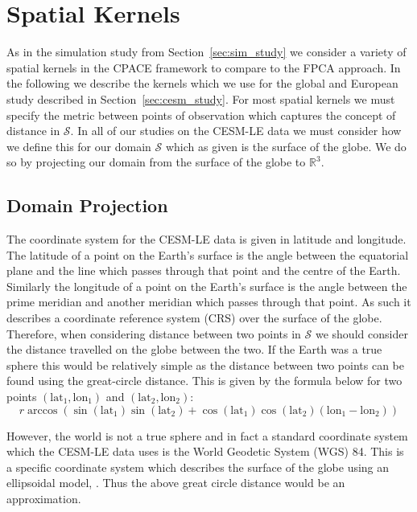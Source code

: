 \section{Spatial Kernels \label{sec:cesm_kernels}}
As in the simulation study from Section~\ref{sec:sim_study} we consider a variety of spatial kernels in the CPACE framework to compare to the FPCA approach.
In the following we describe the kernels which we use for the global and European study described in Section~\ref{sec:cesm_study}.
For most spatial kernels we must specify the metric between points of observation which captures the concept of distance in $\mathcal{S}$.
In all of our studies on the CESM-LE data we must consider how we define this for our domain $\mathcal{S}$ which as given is the surface of the globe.
We do so by projecting our domain from the surface of the globe to $\mathbb{R}^{3}$. 

\subsection{Domain Projection \label{ssec:spatial_projection}}
The coordinate system for the CESM-LE data is given in latitude and longitude.
The latitude of a point on the Earth's surface is the angle between the equatorial plane and the line which passes through that point and the centre of the Earth.
Similarly the longitude of a point on the Earth's surface is the angle between the prime meridian and another meridian which passes through that point. 
As such it describes a coordinate reference system (CRS) over the surface of the globe.
Therefore, when considering distance between two points in $\mathcal{S}$ we should consider the distance travelled on the globe between the two.
If the Earth was a true sphere this would be relatively simple as the distance between two points can be found using the great-circle distance.
This is given by the formula below for two points $\left(\text{lat}_1, \text{lon}_1\right)$ and $\left(\text{lat}_2, \text{lon}_2\right)$: 
\begin{equation}
	r \arccos\left(\sin(\text{lat}_1) \sin(\text{lat}_2) + \cos(\text{lat}_1) \cos(\text{lat}_2) \left( \text{lon}_1 - \text{lon}_2\right)\right)
\end{equation}

However, the world is not a true sphere and in fact a standard coordinate system which the CESM-LE data uses is the World Geodetic System (WGS) 84. 
This is a specific coordinate system which describes the surface of the globe using an ellipsoidal model, \citep{lu_geodetic_2014}. 
Thus the above great circle distance would be an approximation. 

